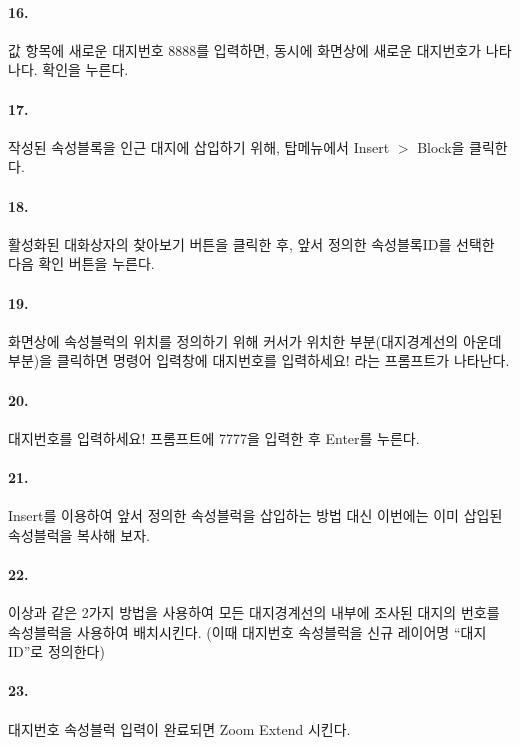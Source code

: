 \documentclass[12pt,a4paper,oneside]{book}
\begin{document}
	\paragraph {16.} 
	값 항목에 새로운 대지번호 8888를 입력하면, 동시에 화면상에 새로운 대지번호가 나타나다. 확인을 누른다.

	\paragraph {17.} 
	작성된 속성블록을 인근 대지에 삽입하기 위해, 탑메뉴에서 Insert $>$ Block을 클릭한다.

	\paragraph {18.} 
	활성화된 대화상자의 찾아보기 버튼을 클릭한 후, 앞서 정의한 속성블록ID를 선택한 다음 확인 버튼을 누른다.

	\paragraph {19.} 
	화면상에 속성블럭의 위치를 정의하기 위해 커서가 위치한 부분(대지경계선의 아운데부분)을 클릭하면 
	명령어 입력창에 대지번호를 입력하세요! 라는 프롬프트가 나타난다.

	\paragraph {20.} 
	대지번호를 입력하세요! 프롬프트에 7777을 입력한 후 Enter를 누른다.

	\paragraph {21.} 
	Insert를 이용하여 앞서 정의한 속성블럭을 삽입하는 방법 대신 이번에는 이미 삽입된 속성블럭을 복사해 보자.

	\paragraph {22.} 
	이상과 같은 2가지 방법을 사용하여 모든 대지경계선의 내부에 조사된 대지의 번호를 속성블럭을 사용하여 배치시킨다. 
	(이때 대지번호 속성블럭을 신규 레이어명 ``대지ID''로 정의한다)

	\paragraph {23.} 
	대지번호 속성블럭 입력이 완료되면 Zoom Extend 시킨다.
\end{document}
